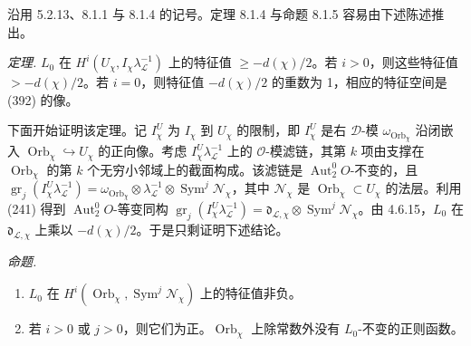 




沿用 5.2.13、8.1.1 与 8.1.4 的记号。定理 8.1.4 与命题 8.1.5 容易由下述陈述推出。

 \emph{定理.} $L_0$ 在 $H^{i}(U_{\chi},I_{\chi}\lambda_{\mathcal{L}}^{-1})$ 上的特征值 $\ge -d(\chi)/2$。若 $i>0$，则这些特征值 $>-d(\chi)/2$。若 $i=0$，则特征值 $-d(\chi)/2$ 的重数为 1，相应的特征空间是 (392) 的像。

下面开始证明该定理。记 $I^{U}_{\chi}$ 为 $I_{\chi}$ 到 $U_{\chi}$ 的限制，即 $I^{U}_{\chi}$ 是右 $\mathcal{D}$-模 $\omega_{\operatorname{Orb}_{\chi}}$ 沿闭嵌入 $\operatorname{Orb}_{\chi}\hookrightarrow U_{\chi}$ 的正向像。考虑 $I^{U}_{\chi}\lambda_{\mathcal{L}}^{-1}$ 上的 $\mathcal{O}$-模滤链，其第 $k$ 项由支撑在 $\operatorname{Orb}_{\chi}$ 的第 $k$ 个无穷小邻域上的截面构成。该滤链是 $\operatorname{Aut}^{0}_{2}O$-不变的，且 $\operatorname{gr}_{j}(I^{U}_{\chi}\lambda_{\mathcal{L}}^{-1})=\omega_{\operatorname{Orb}_{\chi}}\otimes\lambda_{\mathcal{L}}^{-1}\otimes\operatorname{Sym}^{j}\mathcal{N}_{\chi}$，其中 $\mathcal{N}_{\chi}$ 是 $\operatorname{Orb}_{\chi}\subset U_{\chi}$ 的法层。利用 (241) 得到 $\operatorname{Aut}^{0}_{2}O$-等变同构 $\operatorname{gr}_{j}(I^{U}_{\chi}\lambda_{\mathcal{L}}^{-1})=\mathfrak{d}_{\mathcal{L},\chi}\otimes\operatorname{Sym}^{j}\mathcal{N}_{\chi}$。由 4.6.15，$L_0$ 在 $\mathfrak{d}_{\mathcal{L},\chi}$ 上乘以 $-d(\chi)/2$。于是只剩证明下述结论。

 \emph{命题.}
\begin{enumerate}[label=\roman*),leftmargin=2.2em]
\item $L_0$ 在 $H^{i}(\operatorname{Orb}_{\chi},\operatorname{Sym}^{j}\mathcal{N}_{\chi})$ 上的特征值非负。
\item 若 $i>0$ 或 $j>0$，则它们为正。$\operatorname{Orb}_{\chi}$ 上除常数外没有 $L_0$-不变的正则函数。
\end{enumerate}

